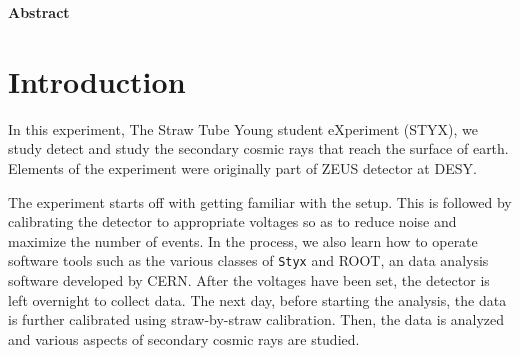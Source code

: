 \documentclass[a4paper]{report}
\numberwithin{equation}{section}
\begin{document}
\begin{titlepage}
	\vspace*{5em}

	\begin{minipage}{0.8\textwidth}
		\begin{centering}
			\textbf{Abstract}\\[0.2cm]
            
		\end{centering}
	\end{minipage}
	
	
	
	
	
	
	 
	
	
\end{titlepage}



\tableofcontents

\chapter{Introduction} \label{chap:intro}

In this experiment, The Straw Tube Young student eXperiment (STYX), we study detect and study the secondary cosmic rays that reach the surface of earth. Elements of the experiment were originally part of ZEUS detector at DESY. 

The experiment starts off with getting familiar with the setup. This is followed by calibrating the detector to appropriate voltages so as to reduce noise and maximize the number of events. In the process, we also learn how to operate software tools such as the various classes of \texttt{Styx} and ROOT, an data analysis software developed by CERN. After the voltages have been set, the detector is left overnight to collect data. The next day, before starting the analysis, the data is further calibrated using straw-by-straw calibration. Then, the data is analyzed and various aspects of secondary cosmic rays are studied. 
\end{document}
